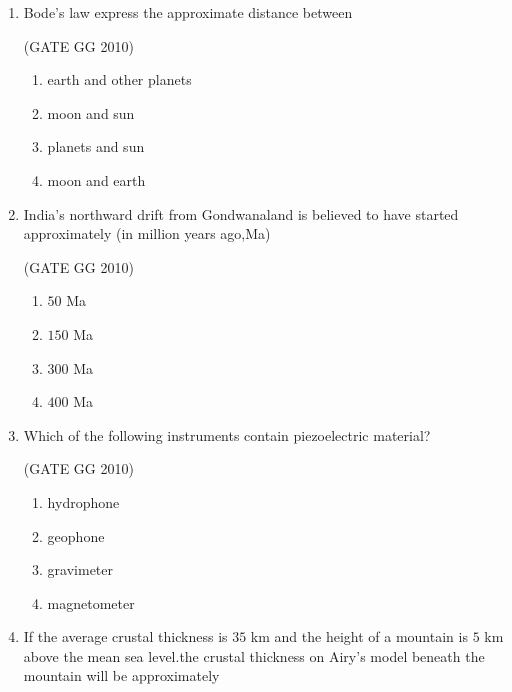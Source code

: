 \documentclass[journal]{IEEEtran}
\begin{document}
\begin{enumerate}[start=1]
\hfill{(GATE GG 2010)}

\begin{enumerate}
\item Panjal volcanism
\item Deccan volcanism
\item Rajmahal volcanism
\item Malani volcanism
\end{enumerate}


\item Bode's law express the approximate distance between

\hfill{(GATE GG 2010)}

\begin{enumerate}
\item earth and other planets
\item moon and sun
\item planets and sun
\item moon and earth
\end{enumerate}

\item  India's northward drift from Gondwanaland is believed to have started approximately (in million years ago,Ma) 

\hspace*{15.7cm}(GATE GG 2010)

\begin{enumerate}
\item $50$ Ma
\item $150$ Ma
\item $300$ Ma
\item $400$ Ma
\end{enumerate}


\item  Which of the following instruments contain piezoelectric material?

\hfill{(GATE GG 2010)}

\begin{enumerate}
\item hydrophone
\item geophone
\item gravimeter
\item magnetometer
\end{enumerate}

\item  If the average crustal thickness is $35$ km and the height of a mountain is $5$ km above the mean sea level.the crustal thickness on Airy's  model beneath the mountain will be approximately


\end{enumerate}
\end{document}
